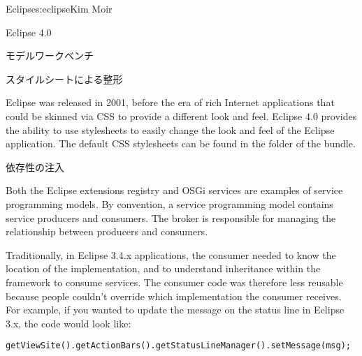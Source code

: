 \begin{aosachapter}{Eclipse}{s:eclipse}{Kim Moir}
\begin{aosasect1}{Eclipse 4.0}
\begin{aosasect2}{モデルワークベンチ}

\end{aosasect2}

\begin{aosasect2}{スタイルシートによる整形}

Eclipse was released in 2001, before the era of rich Internet
applications that could be skinned via CSS to provide a different look
and feel. Eclipse 4.0 provides the ability to use stylesheets to
easily change the look and feel of the Eclipse application. The
default CSS stylesheets can be found in the  folder of the
 bundle.

\end{aosasect2}

\begin{aosasect2}{依存性の注入}

Both the Eclipse extensions registry and OSGi services are examples of service
programming models. By convention, a service programming model contains service
producers and consumers. The broker is responsible for managing the
relationship between producers and consumers.


\pagebreak

Traditionally, in Eclipse 3.4.x applications, the consumer needed
to know the location of the implementation, and to
understand inheritance within the framework to
consume services. The consumer code was therefore less reusable
because people couldn't override which implementation the consumer
receives. For example, if you wanted to update the message on the
status line in Eclipse 3.x, the code would look like:

\begin{verbatim}
getViewSite().getActionBars().getStatusLineManager().setMessage(msg);
\end{verbatim}


\end{aosasect2}
\end{aosasect1}
\end{aosachapter}
